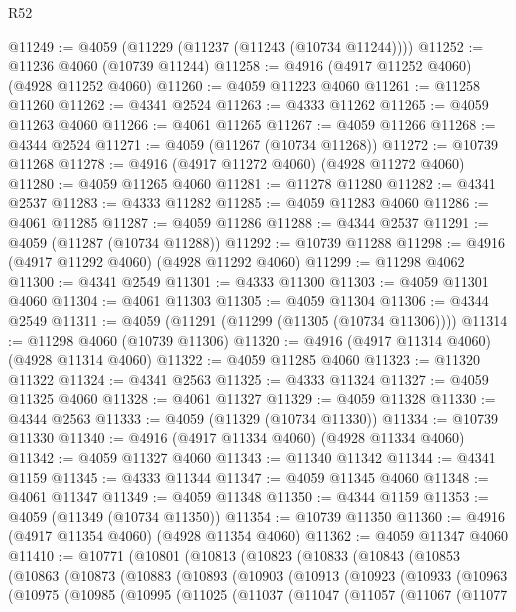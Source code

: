 \begin{lexlean}{R52}
\begin{coremodule}
@11249 := @4059 (@11229 (@11237 (@11243 (@10734 @11244))))
@11252 := @11236 @4060 (@10739 @11244)
@11258 := @4916 (@4917 @11252 @4060) (@4928 @11252 @4060)
@11260 := @4059 @11223 @4060
@11261 := @11258 @11260
@11262 := @4341 @2524
@11263 := @4333 @11262
@11265 := @4059 @11263 @4060
@11266 := @4061 @11265
@11267 := @4059 @11266
@11268 := @4344 @2524
@11271 := @4059 (@11267 (@10734 @11268))
@11272 := @10739 @11268
@11278 := @4916 (@4917 @11272 @4060) (@4928 @11272 @4060)
@11280 := @4059 @11265 @4060
@11281 := @11278 @11280
@11282 := @4341 @2537
@11283 := @4333 @11282
@11285 := @4059 @11283 @4060
@11286 := @4061 @11285
@11287 := @4059 @11286
@11288 := @4344 @2537
@11291 := @4059 (@11287 (@10734 @11288))
@11292 := @10739 @11288
@11298 := @4916 (@4917 @11292 @4060) (@4928 @11292 @4060)
@11299 := @11298 @4062
@11300 := @4341 @2549
@11301 := @4333 @11300
@11303 := @4059 @11301 @4060
@11304 := @4061 @11303
@11305 := @4059 @11304
@11306 := @4344 @2549
@11311 := @4059 (@11291 (@11299 (@11305 (@10734 @11306))))
@11314 := @11298 @4060 (@10739 @11306)
@11320 := @4916 (@4917 @11314 @4060) (@4928 @11314 @4060)
@11322 := @4059 @11285 @4060
@11323 := @11320 @11322
@11324 := @4341 @2563
@11325 := @4333 @11324
@11327 := @4059 @11325 @4060
@11328 := @4061 @11327
@11329 := @4059 @11328
@11330 := @4344 @2563
@11333 := @4059 (@11329 (@10734 @11330))
@11334 := @10739 @11330
@11340 := @4916 (@4917 @11334 @4060) (@4928 @11334 @4060)
@11342 := @4059 @11327 @4060
@11343 := @11340 @11342
@11344 := @4341 @1159
@11345 := @4333 @11344
@11347 := @4059 @11345 @4060
@11348 := @4061 @11347
@11349 := @4059 @11348
@11350 := @4344 @1159
@11353 := @4059 (@11349 (@10734 @11350))
@11354 := @10739 @11350
@11360 := @4916 (@4917 @11354 @4060) (@4928 @11354 @4060)
@11362 := @4059 @11347 @4060
@11410 := @10771
    (@10801
      (@10813
        (@10823
          (@10833
            (@10843
              (@10853
                (@10863
                  (@10873
                    (@10883
                      (@10893
                        (@10903
                          (@10913
                            (@10923
                              (@10933
                                (@10963
                                  (@10975
                                    (@10985
                                      (@10995
                                        (@11025
                                          (@11037
                                            (@11047
                                              (@11057
                                                (@11067
                                                  (@11077

\end{coremodule}
\end{lexlean}
